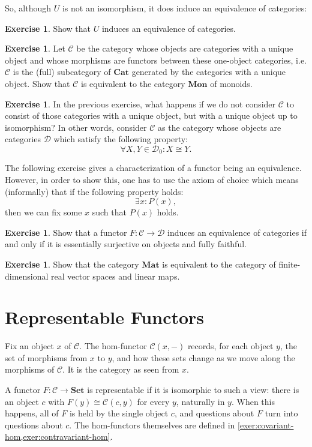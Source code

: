 \documentclass[a4paper,11pt, oneside,titlepage=false]{scrbook}
\theoremstyle{plain}
\theoremstyle{definition}
\newtheorem{exer}[thm]{Exercise}
\newcommand{\Cat}[1]{\mathcal{#1}}
\newcommand{\CC}{\Cat{C}}
\newcommand{\DD}{\Cat{D}}
\newcommand{\Catb}[1]{\mathbf{#1}}
\newcommand{\SET}{\Catb{Set}}
\newcommand{\CAT}{\Catb{Cat}}
\newcommand{\MON}{\Catb{Mon}}
\newcommand{\MAT}{\Catb{Mat}}
\newcommand{\Ob}[1]{{#1}_0}
\begin{document}
So, although $U$ is not an isomorphism, it does induce an equivalence of categories:
\begin{exer} Show that $U$ induces an equivalence of categories.
\end{exer}

\begin{exer} Let $\CC$ be the category whose objects are categories with a unique object and whose morphisms are functors between these one-object categories, i.e. $\CC$ is the (full) subcategory of $\CAT$ generated by the categories with a unique object. Show that $\CC$ is equivalent to the category $\MON$ of monoids.
\end{exer}
\begin{exer}
In the previous exercise, what happens if we do not consider $\CC$ to consist of those categories with a unique object, but with a unique object up to isomorphism? In other words, consider $\CC$ as the category whose objects are categories $\DD$ which satisfy the following property:
\[
\forall X,Y \in \Ob{\DD}: X\cong Y.
\]
\end{exer}

The following exercise gives a characterization of a functor being an equivalence. However, in order to show this, one has to use the axiom of choice which means (informally) that if the following property holds:
\[
\exists x: P(x),
\]
then we can fix some $x$ such that $P(x)$ holds.
\begin{exer} Show that a functor $F:\CC\to\DD$ induces an equivalence of categories if and only if it is essentially surjective on objects and fully faithful.
\end{exer}

\begin{exer}
  Show that the category $\MAT$ is equivalent to the category of finite-dimensional real vector spaces and linear maps.
\end{exer}

\section{Representable Functors}

Fix an object $x$ of $\CC$.
The hom-functor $\CC(x,-)$ records, for each object $y$, the set of morphisms
from $x$ to $y$, and how these sets change as we move along the morphisms of
$\CC$.
It is the category as seen from $x$.

A functor $F : \CC \to \SET$ is representable if it is isomorphic to such a
view: there is an object $c$ with $F(y) \cong \CC(c,y)$ for every $y$,
naturally in $y$.
When this happens, all of $F$ is held by the single object $c$, and questions
about $F$ turn into questions about $c$.
The hom-functors themselves are defined in
\cref{exer:covariant-hom,exer:contravariant-hom}.
\end{document}

